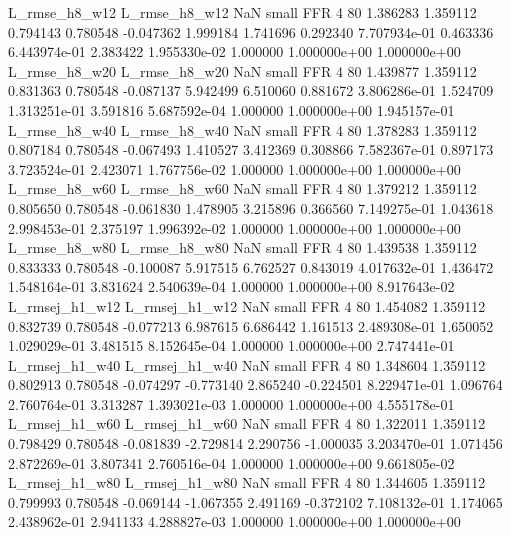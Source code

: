  L_rmse_h8_w12  L_rmse_h8_w12                   NaN      small      FFR                 4 80 1.386283       1.359112 0.794143       0.780548   -0.047362      1.999184      1.741696     0.292340   7.707934e-01  0.463336 6.443974e-01     2.383422   1.955330e-02            1.000000    1.000000e+00        1.000000e+00
 L_rmse_h8_w20  L_rmse_h8_w20                   NaN      small      FFR                 4 80 1.439877       1.359112 0.831363       0.780548   -0.087137      5.942499      6.510060     0.881672   3.806286e-01  1.524709 1.313251e-01     3.591816   5.687592e-04            1.000000    1.000000e+00        1.945157e-01
 L_rmse_h8_w40  L_rmse_h8_w40                   NaN      small      FFR                 4 80 1.378283       1.359112 0.807184       0.780548   -0.067493      1.410527      3.412369     0.308866   7.582367e-01  0.897173 3.723524e-01     2.423071   1.767756e-02            1.000000    1.000000e+00        1.000000e+00
 L_rmse_h8_w60  L_rmse_h8_w60                   NaN      small      FFR                 4 80 1.379212       1.359112 0.805650       0.780548   -0.061830      1.478905      3.215896     0.366560   7.149275e-01  1.043618 2.998453e-01     2.375197   1.996392e-02            1.000000    1.000000e+00        1.000000e+00
 L_rmse_h8_w80  L_rmse_h8_w80                   NaN      small      FFR                 4 80 1.439538       1.359112 0.833333       0.780548   -0.100087      5.917515      6.762527     0.843019   4.017632e-01  1.436472 1.548164e-01     3.831624   2.540639e-04            1.000000    1.000000e+00        8.917643e-02
L_rmsej_h1_w12 L_rmsej_h1_w12                   NaN      small      FFR                 4 80 1.454082       1.359112 0.832739       0.780548   -0.077213      6.987615      6.686442     1.161513   2.489308e-01  1.650052 1.029029e-01     3.481515   8.152645e-04            1.000000    1.000000e+00        2.747441e-01
L_rmsej_h1_w40 L_rmsej_h1_w40                   NaN      small      FFR                 4 80 1.348604       1.359112 0.802913       0.780548   -0.074297     -0.773140      2.865240    -0.224501   8.229471e-01  1.096764 2.760764e-01     3.313287   1.393021e-03            1.000000    1.000000e+00        4.555178e-01
L_rmsej_h1_w60 L_rmsej_h1_w60                   NaN      small      FFR                 4 80 1.322011       1.359112 0.798429       0.780548   -0.081839     -2.729814      2.290756    -1.000035   3.203470e-01  1.071456 2.872269e-01     3.807341   2.760516e-04            1.000000    1.000000e+00        9.661805e-02
L_rmsej_h1_w80 L_rmsej_h1_w80                   NaN      small      FFR                 4 80 1.344605       1.359112 0.799993       0.780548   -0.069144     -1.067355      2.491169    -0.372102   7.108132e-01  1.174065 2.438962e-01     2.941133   4.288827e-03            1.000000    1.000000e+00        1.000000e+00
